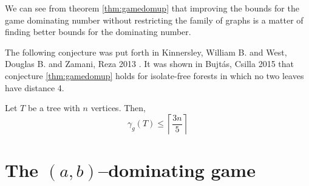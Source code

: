 We can see from theorem \ref{thm:gamedomup} that improving the bounds for the game dominating number without restricting the family of graphs is a matter of finding better bounds for the dominating number. 

The following conjecture was put forth in Kinnersley, William B. and West, Douglas B. and Zamani, Reza 2013 \cite{KiWeZa2013}. It was shown in Bujt\'{a}s, Csilla 2015 that conjecture \ref{thm:gamedomup} holds for isolate-free forests in which no two leaves have distance 4.
\begin{conjecture} \label{thm:treedomup}
    Let $T$ be a tree with $n$ vertices. Then,    
    \[ \gamma_g(T) \leq \left\lceil \frac{3n}{5} \right\rceil\]
\end{conjecture}
 
%
%    
%        
%    
%   
%       

\section{The $(a,b)$--dominating game}

